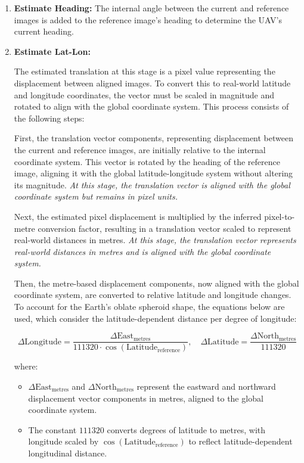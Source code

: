 \begin{enumerate}
    \item \textbf{Estimate Heading:}
    The internal angle between the current and reference images is added to the reference image's heading to determine the UAV's current heading. 
    \item \textbf{Estimate Lat-Lon:}  

    The estimated translation at this stage is a pixel value representing the displacement between aligned images. To convert this to real-world latitude and longitude coordinates, the vector must be scaled in magnitude and rotated to align with the global coordinate system. This process consists of the following steps:

    First, the translation vector components, representing displacement between the current and reference images, are initially relative to the internal coordinate system. This vector is rotated by the heading of the reference image, aligning it with the global latitude-longitude system without altering its magnitude.  
    \emph{At this stage, the translation vector is aligned with the global coordinate system but remains in pixel units.}

    Next, the estimated pixel displacement is multiplied by the inferred pixel-to-metre conversion factor, resulting in a translation vector scaled to represent real-world distances in metres.  
    \emph{At this stage, the translation vector represents real-world distances in metres and is aligned with the global coordinate system.}

    Then, the metre-based displacement components, now aligned with the global coordinate system, are converted to relative latitude and longitude changes. To account for the Earth's oblate spheroid shape, the equations below are used, which consider the latitude-dependent distance per degree of longitude:

    \[
    \Delta \text{Longitude} = \frac{\Delta \text{East}_{\text{metres}}}{111320 \cdot \cos(\text{Latitude}_{\text{reference}})}, \quad \Delta \text{Latitude} = \frac{\Delta \text{North}_{\text{metres}}}{111320}
    \]

    where:
    \begin{itemize}
        \item \(\Delta \text{East}_{\text{metres}}\) and \(\Delta \text{North}_{\text{metres}}\) represent the eastward and northward displacement vector components in metres, aligned to the global coordinate system.
        \item The constant \(111320\) converts degrees of latitude to metres, with longitude scaled by \(\cos(\text{Latitude}_{\text{reference}})\) to reflect latitude-dependent longitudinal distance.
    \end{itemize}


\end{enumerate}
